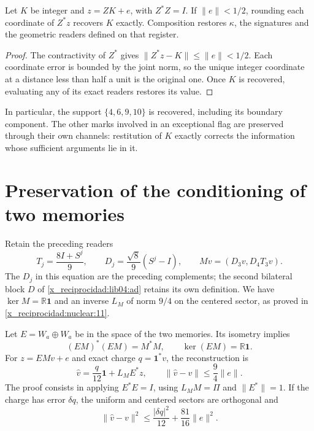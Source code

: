 \begin{proposition}
\label{x_reciprocidad:lib04:prop-redondeo}
Let \(K\) be integer and \(z=ZK+e\), with \(Z^*Z=I\). If
\(\|e\|<1/2\), rounding each coordinate of \(Z^*z\) recovers
\(K\) exactly. Composition restores \(\kappa\), the
signatures and the geometric readers defined on that register.
\end{proposition}

\begin{proof}
The contractivity of \(Z^*\) gives
\(\|Z^*z-K\|\leq\|e\|<1/2\). Each coordinate error is
bounded by the joint norm, so the unique integer coordinate
at a distance less than half a unit is the original one. Once
\(K\) is recovered, evaluating any of its exact readers
restores its value.
\end{proof}

In particular, the support \(\{4,6,9,10\}\) is recovered, including
its boundary component. The other marks involved in an
exceptional flag are preserved through their own channels:
restitution of \(K\) exactly corrects the information whose
sufficient arguments lie in it.

\section{Preservation of the conditioning of two memories}
\label{x_reciprocidad:lib04:dos-memorias}

Retain the preceding readers
\begin{equation}
 T_j=\frac{8I+S^j}{9},\qquad
 D_j=\frac{\sqrt8}{9}(S^j-I),\qquad
 Mv=(D_3v,D_4T_3v).
 \label{x_reciprocidad:lib04:m-antecedente}
\end{equation}
The \(D_j\) in this equation are the preceding complements;
the second bilateral block \(D\) of \eqref{x_reciprocidad:lib04:ad} retains
its own definition. We have \(\ker M=\mathbb R\mathbf1\)
and an inverse \(L_M\) of norm \(9/4\) on the centered sector,
as proved in \cref{x_reciprocidad:nuclear:11}.

Let \(E=W_a\oplus W_a\) be in the space of the two memories.
Its isometry implies
\begin{equation}
 (EM)^*(EM)=M^*M,\qquad
 \ker(EM)=\mathbb R\mathbf1.
 \label{x_reciprocidad:lib04:gram-m-preservado}
\end{equation}
For \(z=EMv+e\) and exact charge
\(q=\mathbf1^*v\), the reconstruction is
\begin{equation}
 \widehat v=\frac q{12}\mathbf1+L_ME^*z,\qquad
 \|\widehat v-v\|\leq\frac94\|e\|.
 \label{x_reciprocidad:lib04:inversa-m}
\end{equation}
The proof consists in applying \(E^*E=I\), using
\(L_MM=\Pi\) and \(\|E^*\|=1\). If the charge has error
\(\delta q\), the uniform and centered sectors are orthogonal and
\begin{equation}
 \|\widehat v-v\|^2
 \leq\frac{|\delta q|^2}{12}+\frac{81}{16}\|e\|^2.
 \label{x_reciprocidad:lib04:error-carga}
\end{equation}

